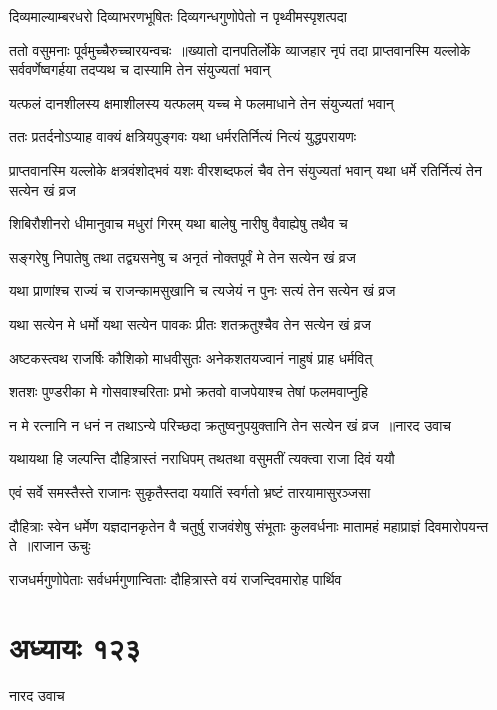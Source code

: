 \twolineshloka
{दिव्यमाल्याम्बरधरो दिव्याभरणभूषितः}
{दिव्यगन्धगुणोपेतो न पृथ्वीमस्पृशत्पदा}


ततो वसुमनाः पूर्वमुच्चैरुच्चारयन्वचः ॥ख्यातो दानपतिर्लोके व्याजहार नृपं तदा
\twolineshloka
{प्राप्तवानस्मि यल्लोके सर्ववर्णेष्वगर्हया}
{तदप्यथ च दास्यामि तेन संयुज्यतां भवान्}


\twolineshloka
{यत्फलं दानशीलस्य क्षमाशीलस्य यत्फलम्}
{यच्च मे फलमाधाने तेन संयुज्यतां भवान्}


\twolineshloka
{ततः प्रतर्दनोऽप्याह वाक्यं क्षत्रियपुङ्गवः}
{यथा धर्मरतिर्नित्यं नित्यं युद्धपरायणः}


\threelineshloka
{प्राप्तवानस्मि यल्लोके क्षत्रवंशोद्भवं यशः}
{वीरशब्दफलं चैव तेन संयुज्यतां भवान्}
{यथा धर्मे रतिर्नित्यं तेन सत्येन खं व्रज}


\twolineshloka
{शिबिरौशीनरो धीमानुवाच मधुरां गिरम्}
{यथा बालेषु नारीषु वैवाह्येषु तथैव च}


\twolineshloka
{सङ्गरेषु निपातेषु तथा तद्व्यसनेषु च}
{अनृतं नोक्तपूर्वं मे तेन सत्येन खं व्रज}


\twolineshloka
{यथा प्राणांश्च राज्यं च राजन्कामसुखानि च}
{त्यजेयं न पुनः सत्यं तेन सत्येन खं व्रज}


\twolineshloka
{यथा सत्येन मे धर्मो यथा सत्येन पावकः}
{प्रीतः शतक्रतुश्चैव तेन सत्येन खं व्रज}


\twolineshloka
{अष्टकस्त्वथ राजर्षिः कौशिको माधवीसुतः}
{अनेकशतयज्वानं नाहुषं प्राह धर्मवित्}


\twolineshloka
{शतशः पुण्डरीका मे गोसवाश्चरिताः प्रभो}
{क्रतवो वाजपेयाश्च तेषां फलमवाप्नुहि}


\threelineshloka
{न मे रत्नानि न धनं न तथाऽन्ये परिच्छदा}
{क्रतुष्वनुपयुक्तानि तेन सत्येन खं व्रज ॥नारद उवाच}
{}


\twolineshloka
{यथायथा हि जल्पन्ति दौहित्रास्तं नराधिपम्}
{तथतथा वसुमतीं त्यक्त्वा राजा दिवं ययौ}


\twolineshloka
{एवं सर्वे समस्तैस्ते राजानः सुकृतैस्तदा}
{ययातिं स्वर्गतो भ्रष्टं तारयामासुरञ्जसा}


\fourlineindentedshloka
{दौहित्राः स्वेन धर्मेण यज्ञदानकृतेन वै}
{चतुर्षु राजवंशेषु संभूताः कुलवर्धनाः}
{मातामहं महाप्राज्ञं दिवमारोपयन्त ते ॥राजान ऊचुः}
{}


\twolineshloka
{राजधर्मगुणोपेताः सर्वधर्मगुणान्विताः}
{दौहित्रास्ते वयं राजन्दिवमारोह पार्थिव}


\chapter{अध्यायः १२३}
\twolineshloka
{नारद उवाच}
{}


